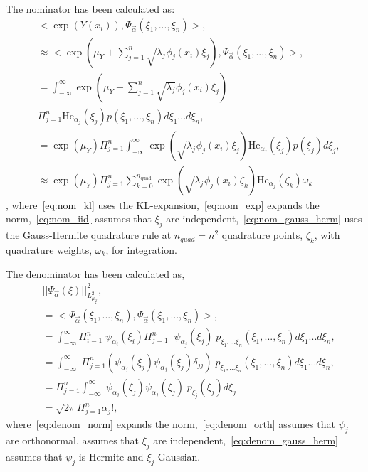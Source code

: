\documentclass[letterpaper, 10 pt, conference, twocolumn]{ieeeconf}  %
\begin{document}
The nominator has been calculated as: 
\begin{align}
  &<\exp(Y(x_i)), \Psi_{\vec\alpha}(\xi_1, ..., \xi_n)>, \label{eq:nom_kl}\\
   &\approx <\exp(\mu_Y + \sum_{j=1}^{n}\sqrt{\lambda_j} \phi_j(x_i) \xi_j), \Psi_{\vec\alpha}(\xi_1, ..., \xi_n)>,\label{eq:nom_exp}\\
   &= \int_{-\infty}^{\infty}\exp(\mu_Y + \sum_{j=1}^n\sqrt{\lambda_j} \phi_j(x_i) \xi_j)\nonumber\\& \Pi_{j=1}^n \text{He}_{\alpha_j}(\xi_j)p(\xi_1,...,\xi_n) d\xi_1 ... d\xi_n,\label{eq:nom_iid}\\
   &= \exp(\mu_Y) \Pi_{j=1}^n \int_{-\infty}^{\infty} \exp(\sqrt{\lambda_j} \phi_j(x_i) \xi_j) \text{He}_{\alpha_j}(\xi_j)p(\xi_j)d\xi_j,\label{eq:nom_gauss_herm}\\
   &\approx \exp(\mu_Y) \Pi_{j=1}^n \sum_{k=0}^{n_\text{quad}} \exp(\sqrt{\lambda_j} \phi_j(x_i) \zeta_k) \text{He}_{\alpha_j}(\zeta_k)\omega_k
\end{align}
, where~\cref{eq:nom_kl} uses the KL-expansion,~\cref{eq:nom_exp} expands the norm,~\cref{eq:nom_iid} assumes that $\xi_j$ are independent,~\cref{eq:nom_gauss_herm} uses the Gauss-Hermite quadrature rule at $n_{quad}=n^2$ quadrature points, $\zeta_k$, with quadrature weights, $\omega_k$, for integration. 

The denominator has been calculated as, 
\begin{align}
  &\lvert\lvert\Psi_{\vec\alpha}(\xi)\rvert\rvert_{L^2_{\mu_{\vec\xi}}}^2, \nonumber\\
  &= <\Psi_{\vec\alpha}(\xi_1, ..., \xi_n), \Psi_{\vec\alpha}(\xi_1, ..., \xi_n)>, \label{eq:denom_norm}\\
   &=\int_{-\infty}^{\infty} \Pi_{i=1}^n\;\psi_{\alpha_i}(\xi_i)\Pi_{j=1}^n\;\; \psi_{\alpha_j}(\xi_j)\;p_{\xi_1,...\xi_n}(\xi_1,...,\xi_n)d\xi_1...d\xi_n\label{eq:denom_orth},\\
   &=\int_{-\infty}^{\infty} \; \Pi_{j=1}^n(\psi_{\alpha_j}(\xi_j)\psi_{\alpha_j}(\xi_j)\delta_{jj})\;p_{\xi_1,...\xi_n}(\xi_1,...,\xi_n)d\xi_1...d\xi_n\label{eq:denom_iid},\\
   &=\Pi_{j=1}^n\int_{-\infty}^{\infty} \;\psi_{\alpha_j}(\xi_j) \psi_{\alpha_j}(\xi_j)\;p_{\xi_j}(\xi_j)d\xi_j\label{eq:denom_gauss_herm}\\
   &=\sqrt{2\pi}\Pi_{j=1}^n\alpha_j!,
\label{eq:denom_pce}
\end{align}
where~\cref{eq:denom_norm} expands the norm,~\cref{eq:denom_orth} assumes that $\psi_j$ are orthonormal, assumes that $\xi_j$ are independent,~\cref{eq:denom_gauss_herm} assumes that $\psi_j$ is Hermite and $\xi_j$ Gaussian. 
\end{document}

